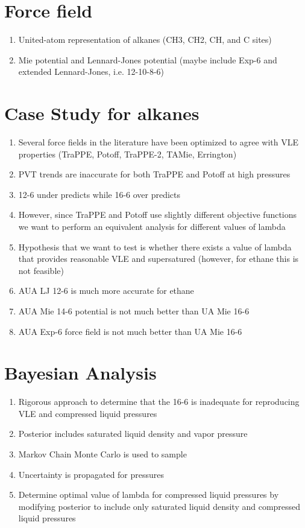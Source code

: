 \documentclass[preprint,letterpaper,floatfix,citeautoscript,aip,jcp]{revtex4-1}
\begin{document}
\section{Force field}

\begin{enumerate}
	\item United-atom representation of alkanes (CH3, CH2, CH, and C sites)
	\item Mie potential and Lennard-Jones potential (maybe include Exp-6 and extended Lennard-Jones, i.e. 12-10-8-6)
\end{enumerate}

\section{Case Study for alkanes}

\begin{enumerate}
	\item Several force fields in the literature have been optimized to agree with VLE properties (TraPPE, Potoff, TraPPE-2, TAMie, Errington)
	\item PVT trends are inaccurate for both TraPPE and Potoff at high pressures
	\item 12-6 under predicts while 16-6 over predicts
	\item However, since TraPPE and Potoff use slightly different objective functions we want to perform an equivalent analysis for different values of lambda
	\item Hypothesis that we want to test is whether there exists a value of lambda that provides reasonable VLE and supersatured (however, for ethane this is not feasible)
	\item AUA LJ 12-6 is much more accurate for ethane
	\item AUA Mie 14-6 potential is not much better than UA Mie 16-6
	\item AUA Exp-6 force field is not much better than UA Mie 16-6
\end{enumerate}

\section{Bayesian Analysis}

\begin{enumerate}
	\item Rigorous approach to determine that the 16-6 is inadequate for reproducing VLE and compressed liquid pressures
	\item Posterior includes saturated liquid density and vapor pressure
	\item Markov Chain Monte Carlo is used to sample
	\item Uncertainty is propagated for pressures
	\item Determine optimal value of lambda for compressed liquid pressures by modifying posterior to include only saturated liquid density and compressed liquid pressures
\end{enumerate}
\end{document}
